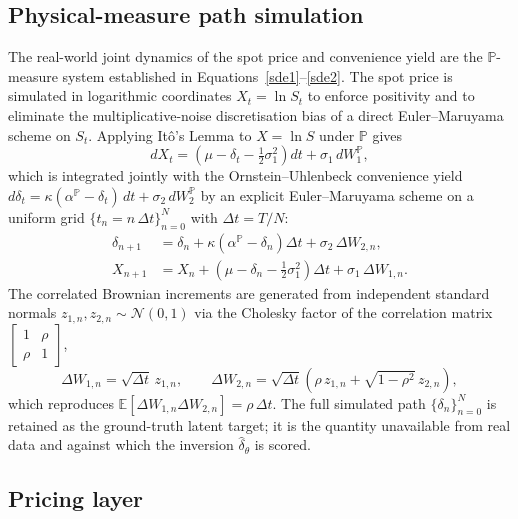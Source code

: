 \subsection{Physical-measure path simulation}

The real-world joint dynamics of the spot price and convenience yield are
the $\mathbb{P}$-measure system established in
Equations~\ref{sde1}--\ref{sde2}. The spot price is simulated in
logarithmic coordinates $X_t = \ln S_t$ to enforce positivity and to
eliminate the multiplicative-noise discretisation bias of a direct
Euler--Maruyama scheme on $S_t$. Applying It\^o's Lemma to $X = \ln S$
under $\mathbb{P}$ gives
\begin{equation}
    dX_t = \left( \mu - \delta_t - \tfrac{1}{2}\sigma_1^2 \right) dt
           + \sigma_1 \, dW_1^{\mathbb{P}},
    \label{eq:log-spot-sde}
\end{equation}
which is integrated jointly with the Ornstein--Uhlenbeck convenience
yield $d\delta_t = \kappa(\alpha^{\mathbb{P}} - \delta_t)\,dt + \sigma_2\,
dW_2^{\mathbb{P}}$ by an explicit Euler--Maruyama scheme on a uniform grid
$\{t_n = n\,\Delta t\}_{n=0}^{N}$ with $\Delta t = T/N$:
\begin{align}
    \delta_{n+1} &= \delta_n + \kappa(\alpha^{\mathbb{P}} - \delta_n)\Delta t
                    + \sigma_2 \, \Delta W_{2,n}, \\
    X_{n+1} &= X_n + \left( \mu - \delta_n - \tfrac{1}{2}\sigma_1^2 \right)\Delta t
               + \sigma_1 \, \Delta W_{1,n}.
\end{align}
The correlated Brownian increments are generated from independent
standard normals $z_{1,n}, z_{2,n} \sim \mathcal{N}(0,1)$ via the
Cholesky factor of the correlation matrix
$\left[\begin{smallmatrix} 1 & \rho \\ \rho & 1 \end{smallmatrix}\right]$,
\begin{equation}
    \Delta W_{1,n} = \sqrt{\Delta t}\, z_{1,n}, \qquad
    \Delta W_{2,n} = \sqrt{\Delta t}\left( \rho\, z_{1,n}
                     + \sqrt{1 - \rho^2}\, z_{2,n} \right),
\end{equation}
which reproduces $\mathbb{E}[\Delta W_{1,n}\Delta W_{2,n}] = \rho\,\Delta t$.
The full simulated path $\{\delta_n\}_{n=0}^{N}$ is retained as the
ground-truth latent target; it is the quantity unavailable from real data
and against which the inversion $\hat{\delta}_\theta$ is scored.

\subsection{Pricing layer}

